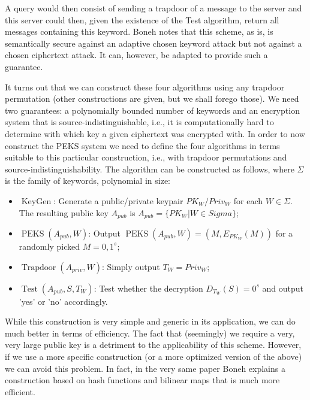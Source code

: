 \documentclass[11pt, a4paper]{article}
\newcommand{\op}[1]{\operatorname{#1}}
\begin{document}
A query would then consist of sending a trapdoor of a message to the server and this server could then, given the existence of the Test algorithm, return all messages containing this keyword.
Boneh notes that this scheme, as is, is semantically secure against an adaptive chosen keyword attack but not against a chosen ciphertext attack.
It can, however, be adapted to provide such a guarantee.

It turns out that we can construct these four algorithms using any trapdoor permutation (other constructions are given, but we shall forego those).
We need two guarantees: a polynomially bounded number of keywords and an encryption system that is source-indistinguishable, i.e., it is computationally hard to determine with which key a given ciphertext was encrypted with.
In order to now construct the PEKS system we need to define the four algorithms in terms suitable to this particular construction, i.e., with trapdoor permutations and source-indistinguishability.
The algorithm can be constructed as follows, where $\Sigma$ is the family of keywords, polynomial in size:
\begin{itemize}
    \item $\op{KeyGen}$: Generate a public/private keypair $PK_W/Priv_W$ for each $W \in \Sigma$. The resulting public key $A_{pub}$ is $A_{pub} = \{ PK_W | W \in Sigma \}$;
    \item $\op{PEKS}(A_{pub},W)$: Output $\op{PEKS}(A_{pub}, W) = (M, E_{PK_W}(M))$ for a randomly picked $M = {0,1}^s$;
    \item $\op{Trapdoor}(A_{priv},W)$: Simply output $T_W = Priv_W$;
    \item $\op{Test}(A_{pub},S,T_W)$: Test whether the decryption $D_{T_W}(S) = 0^s$ and output 'yes' or 'no' accordingly.
\end{itemize}

While this construction is very simple and generic in its application, we can do much better in terms of efficiency.
The fact that (seemingly) we require a very, very large public key is a detriment to the applicability of this scheme.
However, if we use a more specific construction (or a more optimized version of the above) we can avoid this problem.
In fact, in the very same paper Boneh explains a construction based on hash functions and bilinear maps that is much more efficient.
\end{document}
